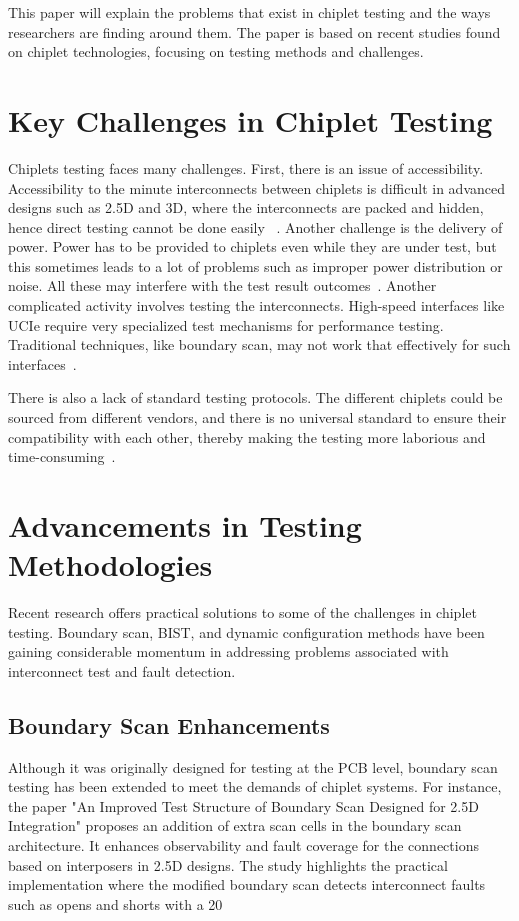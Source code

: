 \documentclass[acmtog, 12pt]{acmart}
\begin{document}
This paper will explain the problems that exist in chiplet testing and the ways researchers are finding around them. The paper is based on recent studies found on chiplet technologies, focusing on testing methods and challenges.


\section*{Key Challenges in Chiplet Testing}
Chiplets testing faces many challenges. First, there is an issue of accessibility. Accessibility to the minute interconnects between chiplets is difficult in advanced designs such as 2.5D and 3D, where the interconnects are packed and hidden, hence direct testing cannot be done easily ~\cite{10365967}.
Another challenge is the delivery of power. Power has to be provided to chiplets even while they are under test, but this sometimes leads to a lot of problems such as improper power distribution or noise. All these may interfere with the test result outcomes~\cite{9107636}.
Another complicated activity involves testing the interconnects. High-speed interfaces like UCIe require very specialized test mechanisms for performance testing. Traditional techniques, like boundary scan, may not work that effectively for such interfaces~\cite{10766679}.

There is also a lack of standard testing protocols. The different chiplets could be sourced from different vendors, and there is no universal standard to ensure their compatibility with each other, thereby making the testing more laborious and time-consuming~\cite{9107636}.


\section*{Advancements in Testing Methodologies}


Recent research offers practical solutions to some of the challenges in chiplet testing. Boundary scan, BIST, and dynamic configuration methods have been gaining considerable momentum in addressing problems associated with interconnect test and fault detection.


\subsection*{Boundary Scan Enhancements}

Although it was originally designed for testing at the PCB level, boundary scan testing has been extended to meet the demands of chiplet systems. For instance, the paper "An Improved Test Structure of Boundary Scan Designed for 2.5D Integration" proposes an addition of extra scan cells in the boundary scan architecture. It enhances observability and fault coverage for the connections based on interposers in 2.5D designs. The study highlights the practical implementation where the modified boundary scan detects interconnect faults such as opens and shorts with a 20%
\end{document}
